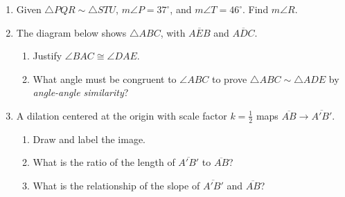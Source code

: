 \documentclass[12pt, twoside]{article}
\begin{document}
\begin{enumerate}
\item Given $\triangle PQR \sim \triangle STU$, $m\angle P=37^\circ$, and $m\angle T=46^\circ$. Find $m\angle R$. \vspace{3cm}

  \item The diagram below shows $\triangle ABC$, with $\overline{AEB}$ and $\overline{ADC}$.
    \begin{multicols}{2}
      \begin{enumerate}
    \item Justify $\angle BAC \cong \angle DAE$.
    \item What angle must be congruent to $\angle ABC$ to prove $\triangle ABC \sim \triangle ADE$ by \emph{angle-angle similarity}? \vspace{3cm}
    \end{enumerate}
    \end{multicols}

\newpage
\item A dilation centered at the origin with scale factor $k=\frac{1}{2}$ maps $\overline{AB} \rightarrow \overline{A'B'}$. 
\begin{multicols}{2}
\begin{enumerate}
  \item Draw and label the image.
  \item What is the ratio of the length of $\overline{A'B'}$ to $\overline{AB}$?
  \item What is the relationship of the slope of $\overline{A'B'}$ and $\overline{AB}$?
  \begin{flushright}
  \end{flushright}
\end{enumerate}
\end{multicols} \vspace{1cm}


\end{enumerate}
\end{document}
